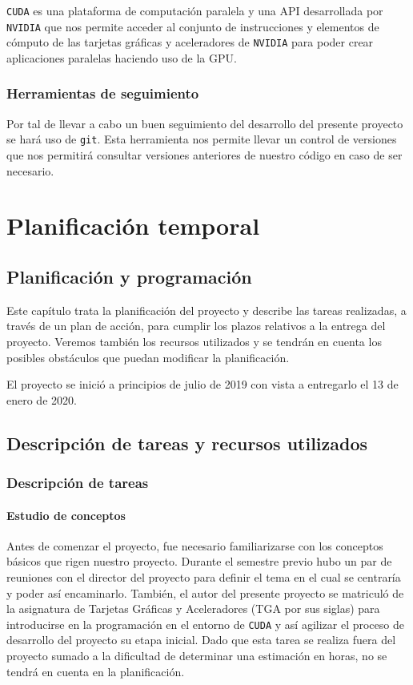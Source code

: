 \documentclass[titlepage,12pt]{report}
\begin{document}
\texttt{CUDA} es una plataforma de computación paralela y una API desarrollada por \texttt{NVIDIA} que nos permite acceder al conjunto de instrucciones y elementos de cómputo de las tarjetas gráficas y aceleradores de \texttt{NVIDIA} para poder crear aplicaciones paralelas haciendo uso de la GPU.

\subsection{Herramientas de seguimiento}

Por tal de llevar a cabo un buen seguimiento del desarrollo del presente proyecto se hará uso de \texttt{git}. Esta herramienta nos permite llevar un control de versiones que nos permitirá consultar versiones anteriores de nuestro código en caso de ser necesario.

\chapter{Planificación temporal}

\section{Planificación y programación}

Este capítulo trata la planificación del proyecto y describe las tareas realizadas, a través de un plan de acción, para cumplir los plazos relativos a la entrega del proyecto. Veremos también los recursos utilizados y se tendrán en cuenta los posibles obstáculos que puedan modificar la planificación.

El proyecto se inició a principios de julio de 2019 con vista a entregarlo el 13 de enero de 2020.

\section{Descripción de tareas y recursos utilizados}

\subsection{Descripción de tareas}

\subsubsection{Estudio de conceptos}

Antes de comenzar el proyecto, fue necesario familiarizarse con los conceptos básicos que rigen nuestro proyecto. Durante el semestre previo hubo un par de reuniones con el director del proyecto para definir el tema en el cual se centraría y poder así encaminarlo. También, el autor del presente proyecto se matriculó de la asignatura de Tarjetas Gráficas y Aceleradores (TGA por sus siglas) para introducirse en la programación en el entorno de \texttt{CUDA} y así agilizar el proceso de desarrollo del proyecto su etapa inicial. Dado que esta tarea se realiza fuera del proyecto sumado a la dificultad de determinar una estimación en horas, no se tendrá en cuenta en la planificación.
\end{document}
